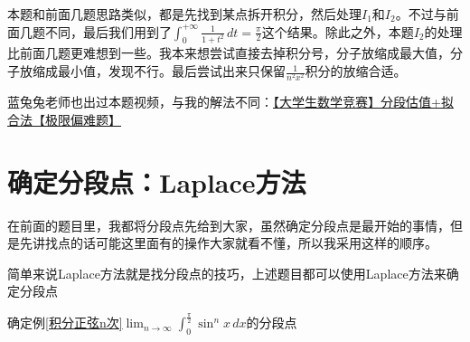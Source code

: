 \begin{remark}
本题和前面几题思路类似，都是先找到某点拆开积分，然后处理$I_1$和$I_2$。不过与前面几题不同，最后我们用到了$\int_{0}^{+\infty} \frac{1}{1+t^2}\,dt = \frac{\pi}{2}$这个结果。除此之外，本题$I_2$的处理比前面几题更难想到一些。我本来想尝试直接去掉积分号，分子放缩成最大值，分子放缩成最小值，发现不行。最后尝试出来只保留$\frac{1}{n^2x^2}$积分的放缩合适。

蓝兔兔老师也出过本题视频，与我的解法不同：\href{https://www.bilibili.com/video/BV1WKxgzJEwf/?share_source=copy_web&vd_source=270527b9d8a800872b201575fba2747c}{【大学生数学竞赛】分段估值+拟合法【极限偏难题】}
\end{remark}







\section{确定分段点：Laplace方法}

在前面的题目里，我都将分段点先给到大家，虽然确定分段点是最开始的事情，但是先讲找点的话可能这里面有的操作大家就看不懂，所以我采用这样的顺序。

简单来说Laplace方法就是找分段点的技巧，上述题目都可以使用Laplace方法来确定分段点

\vspace{1mm}
\begin{example}
确定例\ref{积分正弦n次}$ \displaystyle \lim_{n \to \infty} \int_{0}^{\frac{\pi}{2}} \sin^{n}x \,dx$的分段点
\end{example}
\vspace{1mm}

